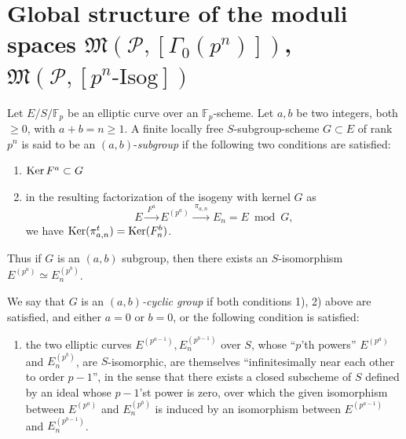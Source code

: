 \section[Global structure of the moduli spaces]{Global structure of the moduli spaces \texorpdfstring{$\mathfrak{M}(\mathcal{P}, [\Gamma_0(p^n)])$}{M(P,[Gamma_0(p^n)])}, \texorpdfstring{$\mathfrak{M}(\mathcal{P}, [p^n\text{-Isog}])$}{M(P,[p^n-Isog])}}
\label{sec:13.4}

\begin{definition}\label{def:13.4.1}
Let $E/S/\mathbb{F}_p$ be an elliptic curve over an $\mathbb{F}_p$-scheme. Let $a, b$ be two integers, both $\ge 0$, with $a + b = n \ge 1$. A finite locally free $S$-subgroup-scheme $G \subset E$ of rank $p^n$ is said to be an $(a,b)$-\emph{subgroup} if the following two conditions are satisfied:
\begin{enumerate}[label=(\arabic*)]
\item $\operatorname{Ker} F^a \subset G$
\item in the resulting factorization of the isogeny with kernel $G$ as
\[
E \xrightarrow{\ F^a\ } E^{(p^a)} \xrightarrow{\ \pi_{a,n}\ } E_n = E \bmod G ,
\]
we have $\operatorname{Ker}(\pi^t_{a,n}) = \operatorname{Ker}(F^b_n)$.
\end{enumerate}
\end{definition}

\kmitem\label{item:13.4.2}
Thus if $G$ is an $(a,b)$ subgroup, then there exists an $S$-isomorphism $E^{(p^a)} \simeq E_n^{(p^b)}$.

\kmitem\label{item:13.4.3}
We say that $G$ is an \emph{$(a,b)$-cyclic group} if both conditions 1), 2) above are satisfied, and either $a = 0$ or $b = 0$, or the following condition is satisfied:
\begin{enumerate}[label=(\arabic*), start=3]
\item the two elliptic curves $E^{(p^{a-1})}, E_n^{(p^{b-1})}$ over $S$, whose ``$p$'th powers'' $E^{(p^a)}$ and $E_n^{(p^b)}$, are $S$-isomorphic, are themselves ``infinitesimally near each other to order $p-1$'', in the sense that there exists a closed subscheme of $S$ defined by an ideal whose $p-1$'st power is zero, over which the given isomorphism between $E^{(p^a)}$ and $E_n^{(p^b)}$ is induced by an isomorphism between $E^{(p^{a-1})}$ and $E_n^{(p^{b-1})}$.
\end{enumerate}

